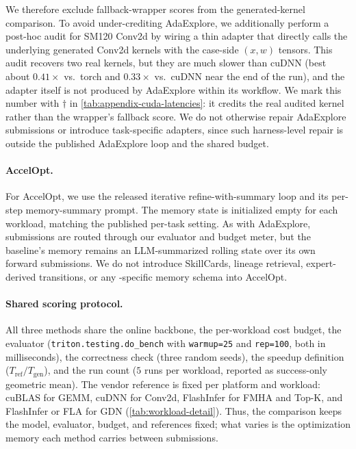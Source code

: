 We therefore exclude fallback-wrapper scores from the generated-kernel comparison. To avoid under-crediting AdaExplore, we additionally perform a post-hoc audit for SM120 Conv2d by wiring a thin adapter that directly calls the underlying generated Conv2d kernels with the case-side $(x,w)$ tensors. This audit recovers two real kernels, but they are much slower than cuDNN (best about $0.41\times$ vs.\ torch and $0.33\times$ vs.\ cuDNN near the end of the run), and the adapter itself is not produced by AdaExplore within its workflow. We mark this number with $\dagger$ in \autoref{tab:appendix-cuda-latencies}: it credits the real audited kernel rather than the wrapper's fallback score. We do not otherwise repair AdaExplore submissions or introduce task-specific adapters, since such harness-level repair is outside the published AdaExplore loop and the shared budget.

\paragraph{AccelOpt.}
For AccelOpt, we use the released iterative refine-with-summary loop and its per-step memory-summary prompt. The memory state is initialized empty for each workload, matching the published per-task setting. As with AdaExplore, submissions are routed through our evaluator and budget meter, but the baseline's memory remains an LLM-summarized rolling state over its own forward submissions. We do not introduce SkillCards, lineage retrieval, expert-derived transitions, or any \sys-specific memory schema into AccelOpt.

\paragraph{Shared scoring protocol.}
All three methods share the online backbone, the per-workload cost budget, the evaluator (\texttt{triton.testing.do\_bench} with \texttt{warmup=25} and \texttt{rep=100}, both in milliseconds), the correctness check (three random seeds), the speedup definition ($T_{\mathrm{ref}}/T_{\mathrm{gen}}$), and the run count ($5$ runs per workload, reported as success-only geometric mean). The vendor reference is fixed per platform and workload: cuBLAS for GEMM, cuDNN for Conv2d, FlashInfer for FMHA and Top-K, and FlashInfer or FLA for GDN (\autoref{tab:workload-detail}). Thus, the comparison keeps the model, evaluator, budget, and references fixed; what varies is the optimization memory each method carries between submissions.

